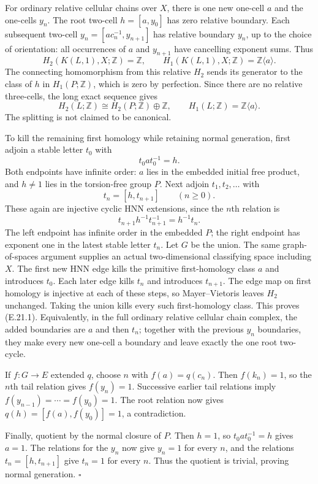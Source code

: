 For ordinary relative cellular chains over $X$, there is one new
one-cell $a$ and the one-cells $y_n$. The root two-cell
$h=[a,y_0]$ has zero relative boundary. Each subsequent two-cell
$y_n=[a c_n^{-1},y_{n+1}]$ has relative boundary $y_n$, up to the
choice of orientation: all occurrences of $a$ and $y_{n+1}$ have
cancelling exponent sums. Thus
\[
 H_2(K(L,1),X;\mathbb Z)=\mathbb Z,\qquad
 H_1(K(L,1),X;\mathbb Z)=\mathbb Z\langle a\rangle.
\]
The connecting homomorphism from this relative $H_2$ sends its
generator to the class of $h$ in $H_1(P;\mathbb Z)$, which is
zero by perfection. Since there are no relative three-cells, the
long exact sequence gives
\[
 H_2(L;\mathbb Z)\cong H_2(P;\mathbb Z)\oplus\mathbb Z,
 \qquad H_1(L;\mathbb Z)=\mathbb Z\langle a\rangle.
\]
The splitting is not claimed to be canonical.

To kill the remaining first homology while retaining normal
generation, first adjoin a stable letter $t_0$ with
\[
 t_0 a t_0^{-1}=h.
\]
Both endpoints have infinite order: $a$ lies in the embedded
initial free product, and $h\ne1$ lies in the torsion-free group
$P$. Next adjoin $t_1,t_2,\ldots$ with
\[
 t_n=[h,t_{n+1}]\qquad(n\ge0).
\]
These again are injective cyclic HNN extensions, since the $n$th
relation is
\[
 t_{n+1}h^{-1}t_{n+1}^{-1}=h^{-1}t_n.
\]
The left endpoint has infinite order in the embedded $P$; the right
endpoint has exponent one in the latest stable letter $t_n$.
Let $G$ be the union. The same graph-of-spaces argument supplies
an actual two-dimensional classifying space including $X$.
The first new HNN edge kills the primitive first-homology class
$a$ and introduces $t_0$. Each later edge kills $t_n$ and introduces
$t_{n+1}$. The edge map on first homology is injective at each of
these steps, so Mayer--Vietoris leaves $H_2$ unchanged. Taking the
union kills every such first-homology class. This proves (E.21.1).
Equivalently, in the full ordinary relative cellular chain complex,
the added boundaries are $a$ and then $t_n$; together with the
previous $y_n$ boundaries, they make every new one-cell a boundary
and leave exactly the one root two-cycle.

If $f:G\to E$ extended $q$, choose $n$ with
$f(a)=q(c_n)$. Then $f(k_n)=1$, so the $n$th tail relation gives
$f(y_n)=1$. Successive earlier tail relations imply
$f(y_{n-1})=\cdots=f(y_0)=1$. The root relation now gives
$q(h)=[f(a),f(y_0)]=1$, a contradiction.

Finally, quotient by the normal closure of $P$. Then $h=1$,
so $t_0 a t_0^{-1}=h$ gives $a=1$. The relations for the $y_n$
now give $y_n=1$ for every $n$, and the relations
$t_n=[h,t_{n+1}]$ give $t_n=1$ for every $n$.
Thus the quotient is trivial, proving normal generation.
\hfill$\square$

